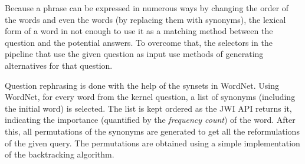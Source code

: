 Because a phrase can be expressed in numerous ways by changing the order of the words and even the words (by replacing them with synonyms), the lexical form of a word in not enough to use it as a matching method between the question and the potential answers. To overcome that, the selectors in the pipeline that use the given question as input use methods of generating alternatives for that question.

Question rephrasing is done with the help of the synsets in WordNet. Using WordNet, for every word from the kernel question, a list of synonyms (including the initial word) is selected. The list is kept ordered as the JWI API returns it, indicating the importance (quantified by the {\em frequency count}) of the word. After this, all permutations of the synonyms are generated to get all the reformulations of the given query. The permutations are obtained using a simple implementation of the backtracking algorithm.


